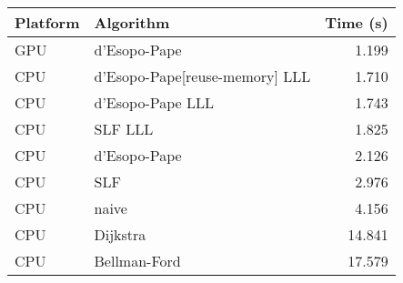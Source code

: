 \begin{tabular}{llr}
  \hline
  Platform & Algorithm & Time (s) \\
  \hline
  GPU & d'Esopo-Pape & 1.199 \\
  CPU & d'Esopo-Pape[reuse-memory] LLL & 1.710 \\
  CPU & d'Esopo-Pape LLL & 1.743 \\
  CPU & SLF LLL & 1.825 \\
  CPU & d'Esopo-Pape & 2.126 \\
  CPU & SLF & 2.976 \\
  CPU & naive & 4.156 \\
  CPU & Dijkstra & 14.841 \\
  CPU & Bellman-Ford & 17.579 \\
  \hline
\end{tabular}
